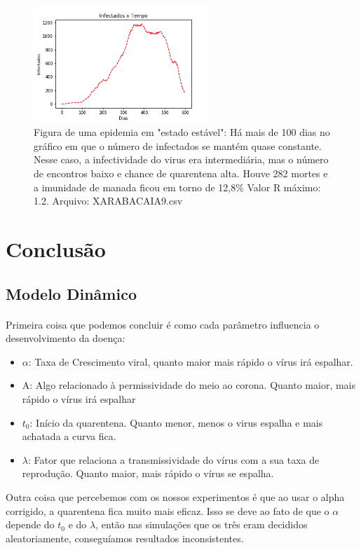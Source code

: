 \documentclass[11pt]{article}
\begin{document}
\begin{figure}[htbp]
\centering
\includegraphics[width=250px]{images/XARABACAIA9.png}
\caption{Figura de uma epidemia em "estado estável": Há mais de 100 dias no gráfico em que o número de infectados se mantém  quase constante. Nesse caso, a infectividade do virus era intermediária, mas o número de encontros baixo e chance de quarentena alta. Houve 282 mortes e a imunidade de manada ficou em torno de 12,8\% Valor R máximo: 1.2. Arquivo: XARABACAIA9.csv}
\end{figure}

\newpage
\section{Conclusão}
\label{sec:org90c942f}
\subsection{Modelo Dinâmico}
\label{sec:orgef795bc}
\paragraph{} Primeira coisa que podemos concluir é como cada parâmetro influencia o desenvolvimento da doença:

\begin{itemize}
\item \(\alpha\): Taxa de Crescimento viral, quanto maior
mais rápido o vírus irá espalhar.
\item A: Algo relacionado à permissividade do meio ao
corona. Quanto maior, mais rápido o vírus irá
espalhar
\item \(t_0\): Início da quarentena. Quanto menor,
menos o virus espalha e mais achatada a curva fica.
\item \(\lambda\): Fator que relaciona a transmissividade
do vírus com a sua taxa de reprodução. Quanto maior,
mais rápido o vírus se espalha.
\end{itemize}

Outra coisa que percebemos com os nossos experimentos é que ao usar o alpha corrigido, 
a quarentena fica muito mais eficaz.
Isso se deve ao fato de que o \(\alpha\) depende do \(t_0\) e do \(\lambda\), então nas simulações que os três eram decididos 
aleatoriamente, conseguíamos resultados inconsistentes.
\end{document}
